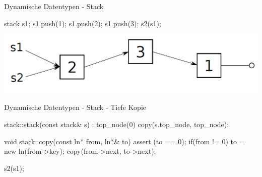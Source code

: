 \ifnum\conditionmacro=1 \documentclass[handout,usenames,dvipsnames]{beamer}\fi
\begin{document}
\begin{frame}[fragile]{Dynamische Datentypen - Stack}
\begin{TPCpp}
stack s1;
s1.push(1);
s1.push(2);
s1.push(3);
s2(s1);
\end{TPCpp}

\begin{center}
\includegraphics[width=0.9\linewidth]{Pictures/Stack1}
\end{center}

\end{frame}


\begin{frame}[fragile]{Dynamische Datentypen - Stack - Tiefe Kopie}
\begin{TFCpp}
stack::stack(const stack& s) : top_node(0) {
	copy(s.top_node, top_node);
}

void stack::copy(const ln* from, ln*& to){
	assert (to == 0);
	if(from != 0){
		to = new ln(from->key);
		copy(from->next, to->next);
	}
}
\end{TFCpp}

\begin{TPCpp}
s2(s1);
\end{TPCpp}

\end{frame}

\end{document}
